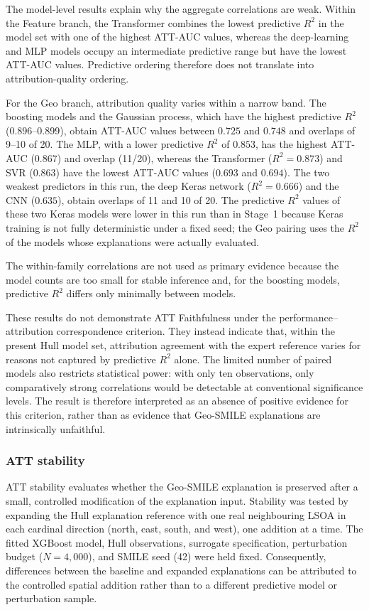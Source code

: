 The model-level results explain why the aggregate correlations are weak.
Within the Feature branch, the Transformer combines the lowest predictive
$R^2$ in the model set with one of the highest ATT-AUC values, whereas the
deep-learning and MLP models occupy an intermediate predictive range but have
the lowest ATT-AUC values. Predictive ordering therefore does not translate
into attribution-quality ordering.

For the Geo branch, attribution quality varies within a narrow band. The
boosting models and the Gaussian process, which have the highest predictive
$R^2$ (0.896--0.899), obtain ATT-AUC values between $0.725$ and $0.748$ and
overlaps of 9--10 of 20. The MLP, with a lower predictive $R^2$ of $0.853$,
has the highest ATT-AUC ($0.867$) and overlap (11/20), whereas the
Transformer ($R^2=0.873$) and SVR ($0.863$) have the lowest ATT-AUC values
($0.693$ and $0.694$). The two weakest predictors in this run, the deep Keras
network ($R^2=0.666$) and the CNN ($0.635$), obtain overlaps of 11 and 10 of
20. The predictive $R^2$ values of these two Keras models were lower in this
run than in Stage~1 because Keras training is not fully deterministic under a
fixed seed; the Geo pairing uses the $R^2$ of the models whose explanations
were actually evaluated.

The within-family correlations are not used as primary evidence because the
model counts are too small for stable inference and, for the boosting models,
predictive $R^2$ differs only minimally between models.

These results do not demonstrate ATT Faithfulness under the
performance--attribution correspondence criterion. They instead indicate that,
within the present Hull model set, attribution agreement with the expert
reference varies for reasons not captured by predictive $R^2$ alone. The
limited number of paired models also restricts statistical power: with only
ten observations, only comparatively strong correlations would be detectable
at conventional significance levels. The result is therefore interpreted as an
absence of positive evidence for this criterion, rather than as evidence that
Geo-SMILE explanations are intrinsically unfaithful.


\subsubsection{ATT stability}
\label{sec:hull_att_stability}

ATT stability evaluates whether the Geo-SMILE explanation is preserved after a
small, controlled modification of the explanation input. Stability was tested
by expanding the Hull explanation reference with one real neighbouring LSOA in
each cardinal direction (north, east, south, and west), one addition at a time.
The fitted XGBoost model, Hull observations, surrogate specification,
perturbation budget ($N=4{,}000$), and SMILE seed (42) were held fixed.
Consequently, differences between the baseline and expanded explanations can be
attributed to the controlled spatial addition rather than to a different
predictive model or perturbation sample.

